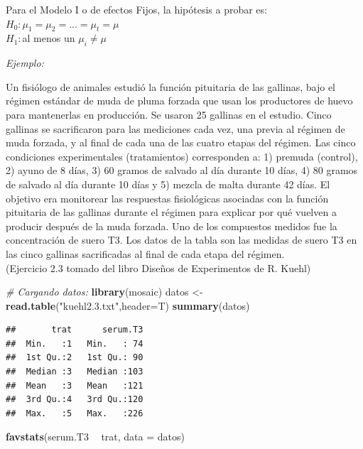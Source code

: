 \documentclass[]{book}
\newenvironment{Shaded}{\begin{snugshade}}{\end{snugshade}}
\newcommand{\KeywordTok}[1]{\textcolor[rgb]{0.13,0.29,0.53}{\textbf{#1}}}
\newcommand{\DataTypeTok}[1]{\textcolor[rgb]{0.13,0.29,0.53}{#1}}
\newcommand{\StringTok}[1]{\textcolor[rgb]{0.31,0.60,0.02}{#1}}
\newcommand{\CommentTok}[1]{\textcolor[rgb]{0.56,0.35,0.01}{\textit{#1}}}
\newcommand{\OperatorTok}[1]{\textcolor[rgb]{0.81,0.36,0.00}{\textbf{#1}}}
\newcommand{\NormalTok}[1]{#1}
\begin{document}
Para el Modelo I o de efectos Fijos, la hipótesis a probar es:\\
\(H_0:\mu_1=\mu_2=... =\mu_t=\mu\)\\
\(H_1:\)al menos un \(\mu_i \neq \mu\)

\emph{Ejemplo:}

Un fisiólogo de animales estudió la función pituitaria de las gallinas,
bajo el régimen estándar de muda de pluma forzada que usan los
productores de huevo para mantenerlas en producción. Se usaron 25
gallinas en el estudio. Cinco gallinas se sacrificaron para las
mediciones cada vez, una previa al régimen de muda forzada, y al final
de cada una de las cuatro etapas del régimen. Las cinco condiciones
experimentales (tratamientos) corresponden a: 1) premuda (control), 2)
ayuno de 8 días, 3) 60 gramos de salvado al día durante 10 días, 4) 80
gramos de salvado al día durante 10 días y 5) mezcla de malta durante 42
días. El objetivo era monitorear las respuestas fisiológicas asociadas
con la función pituitaria de las gallinas durante el régimen para
explicar por qué vuelven a producir después de la muda forzada. Uno de
los compuestos medidos fue la concentración de suero T3. Los datos de la
tabla son las medidas de suero T3 en las cinco gallinas sacrificadas al
final de cada etapa del régimen.\\
(Ejercicio 2.3 tomado del libro Diseños de Experimentos de R. Kuehl)

\begin{Shaded}
\begin{Highlighting}[]
\CommentTok{# Cargando datos:}
\KeywordTok{library}\NormalTok{(mosaic)}
\NormalTok{datos <-}\StringTok{ }\KeywordTok{read.table}\NormalTok{(}\StringTok{"kuehl2.3.txt"}\NormalTok{,}\DataTypeTok{header=}\NormalTok{T)}
\KeywordTok{summary}\NormalTok{(datos)}
\end{Highlighting}
\end{Shaded}

\begin{verbatim}
##       trat      serum.T3  
##  Min.   :1   Min.   : 74  
##  1st Qu.:2   1st Qu.: 90  
##  Median :3   Median :103  
##  Mean   :3   Mean   :121  
##  3rd Qu.:4   3rd Qu.:120  
##  Max.   :5   Max.   :226
\end{verbatim}

\begin{Shaded}
\begin{Highlighting}[]
\KeywordTok{favstats}\NormalTok{(serum.T3 }\OperatorTok{~}\StringTok{ }\NormalTok{trat, }\DataTypeTok{data =}\NormalTok{ datos)}
\end{Highlighting}
\end{Shaded}
\end{document}
